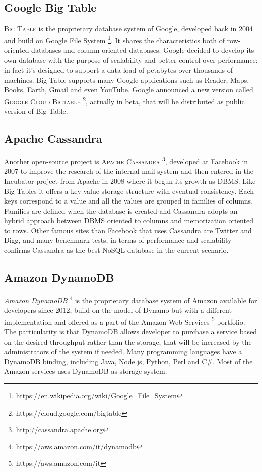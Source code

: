 \subsection{Google Big Table}
\textsc{Big Table} is the proprietary database system of Google, developed back in 2004 and build on Google File System \footnote{https://en.wikipedia.org/wiki/Google\_File\_System}. It shares the characteristics both of row-oriented databases and column-oriented databases. Google decided to develop its own database with the purpose of scalability and better control over performance: in fact it’s designed to support a data-load of petabytes over thousands of machines.
Big Table supports many Google applications such as Reader, Maps, Books, Earth, Gmail and even YouTube.
Google announced a new version called \textsc{Google Cloud Bigtable }\footnote{https://cloud.google.com/bigtable}, actually in beta, that will be distributed as public version of Big Table.

\subsection{Apache Cassandra}
Another open-source project is \textsc{Apache Cassandra} \footnote{http://cassandra.apache.org}, developed at Facebook in 2007 to improve the research of the internal mail system and then entered in the Incubator project from Apache in 2008 where it begun its growth as DBMS.
Like Big Tables it offers a key-value storage structure with eventual consistency. Each keys correspond to a value and all the values are grouped in families of columns. Families are defined when the database is created and Cassandra adopts an hybrid approach between DBMS oriented to columns and memorization oriented to rows.
Other famous sites than Facebook that uses Cassandra are Twitter and Digg, and many benchmark tests, in terms of performance and scalability confirms Cassandra as the best NoSQL database in the current scenario.

\subsection{Amazon DynamoDB}
\textit{Amazon DynamoDB} \footnote{https://aws.amazon.com/it/dynamodb} is the proprietary database system of Amazon available for developers since 2012, build on the model of Dynamo but with a different implementation and offered as a part of the Amazon Web Services \footnote{https://aws.amazon.com/it} portfolio. The particularity is that DynamoDB allows developer to purchase a service based on the desired throughput rather than the storage, that will be increased by the administrators of the system if needed.
Many programming languages have a DynamoDB binding, including Java, Node.js, Python, Perl and C\#.
Most of the Amazon services uses DynamoDB as storage system.


